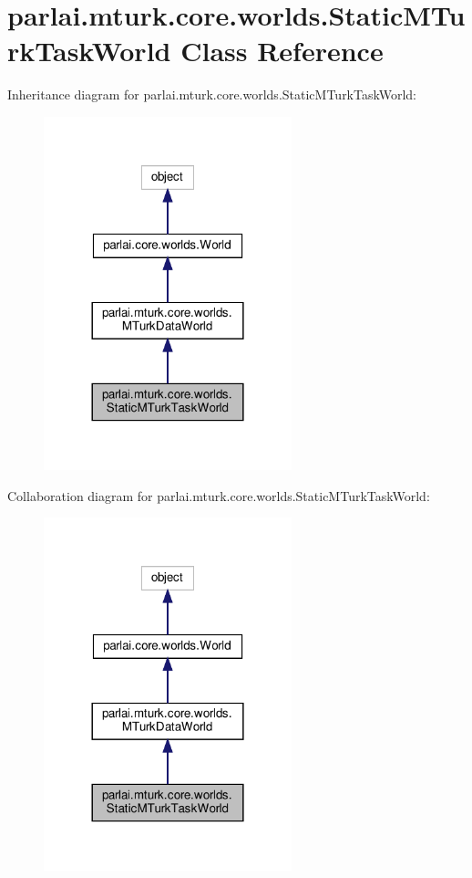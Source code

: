 \hypertarget{classparlai_1_1mturk_1_1core_1_1worlds_1_1StaticMTurkTaskWorld}{}\section{parlai.\+mturk.\+core.\+worlds.\+Static\+M\+Turk\+Task\+World Class Reference}
\label{classparlai_1_1mturk_1_1core_1_1worlds_1_1StaticMTurkTaskWorld}


Inheritance diagram for parlai.\+mturk.\+core.\+worlds.\+Static\+M\+Turk\+Task\+World\+:
\nopagebreak
\begin{figure}[H]
\begin{center}
\leavevmode
\includegraphics[width=204pt]{classparlai_1_1mturk_1_1core_1_1worlds_1_1StaticMTurkTaskWorld__inherit__graph}
\end{center}
\end{figure}


Collaboration diagram for parlai.\+mturk.\+core.\+worlds.\+Static\+M\+Turk\+Task\+World\+:
\nopagebreak
\begin{figure}[H]
\begin{center}
\leavevmode
\includegraphics[width=204pt]{classparlai_1_1mturk_1_1core_1_1worlds_1_1StaticMTurkTaskWorld__coll__graph}
\end{center}
\end{figure}
